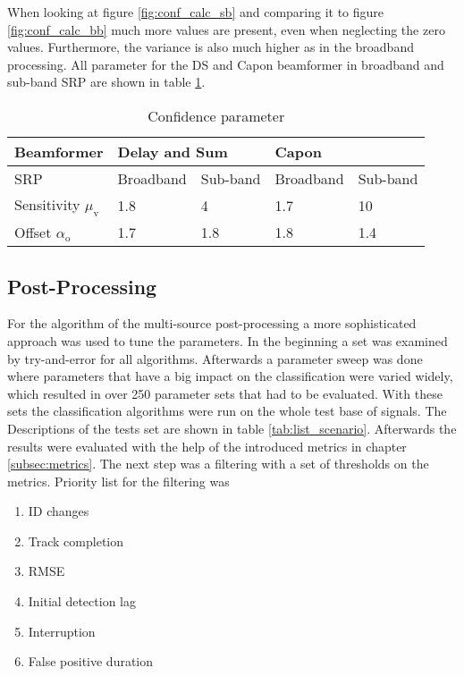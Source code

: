 When looking at figure \ref{fig:conf_calc_sb} and comparing it to figure \ref{fig:conf_calc_bb} much more values are present, even when neglecting the zero values. Furthermore, the variance is also much higher as in the broadband processing. All parameter for the \ac{DS} and Capon beamformer in broadband and sub-band \ac{SRP} are shown in table \ref{tab:conf_par}.

\begin{table}[!ht]
\centering
\begin{tabular}{l|ll|ll}
\toprule
Beamformer                 & \multicolumn{2}{l}{Delay and Sum} & \multicolumn{2}{l}{Capon} \\ \midrule
SRP                        & Broadband        & Sub-band       & Broadband    & Sub-band   \\ \midrule
Sensitivity $\mu_\text{v}$ & 1.8              & 4              & 1.7          & 10         \\
Offset $\alpha_\text{o}$   & 1.7              & 1.8            & 1.8          & 1.4       \\
\bottomrule
\end{tabular}
\caption{Confidence parameter}
\label{tab:conf_par}
\end{table}

\subsection{Post-Processing}
For the algorithm of the multi-source post-processing a more sophisticated approach was used to tune the parameters. In the beginning a set was examined by try-and-error for all algorithms. Afterwards a parameter sweep was done where parameters that have a big impact on the classification were varied widely, which resulted in over 250 parameter sets that had to be evaluated. With these sets the classification algorithms were run on the whole test base of signals. The Descriptions of the tests set are shown in table \ref{tab:list_scenario}. Afterwards the results were evaluated with the help of the introduced metrics in chapter \ref{subsec:metrics}. The next step was a filtering with a set of thresholds on the metrics. Priority list for the filtering was

\begin{enumerate}
\item ID changes
\item Track completion
\item \ac{RMSE}
\item Initial detection lag
\item Interruption
\item False positive duration
\end{enumerate}

